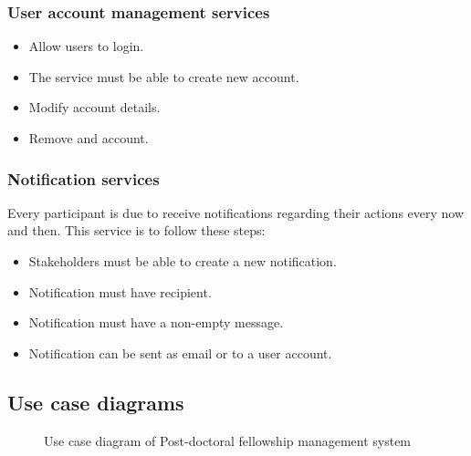 \documentclass[12pt]{article}
\begin{document}
\subsubsection{User account management services} %
\begin{itemize}
	\item Allow users to login.
	\item The service must be able to create new account.
	\item Modify account details.
	\item Remove and account.
\end{itemize}
\subsubsection{Notification services}
Every participant is due to receive notifications regarding their actions every now and then. This service is to follow these steps:
\begin{itemize}
	\item Stakeholders must be able to create a new notification.
	\item Notification must have recipient.
	\item Notification must have a non-empty message.
	\item Notification can  be sent as email or to a user account.
\end{itemize}
\vspace{0.2in}

\subsection{Use case diagrams}
\begin{figure}[H]
\centering	
{}
\caption{Use case diagram of Post-doctoral fellowship management system}
\end{figure}
\end{document}
